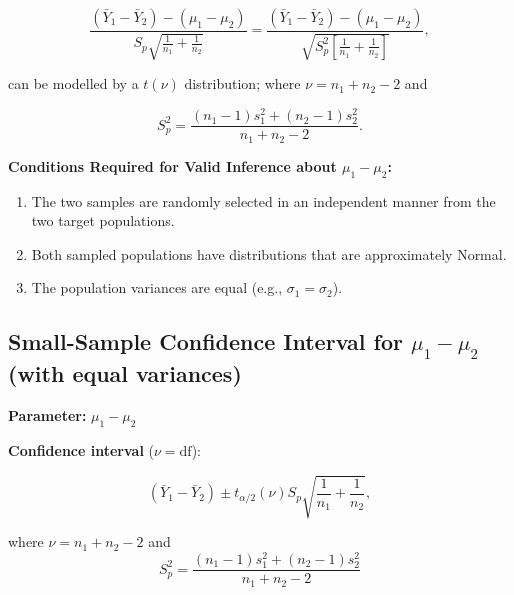 \[
\frac{(\bar{Y}_1 - \bar{Y}_2) - (\mu_1 - \mu_2)}{S_p \sqrt{\frac{1}{n_1} + \frac{1}{n_2}}}
= \frac{(\bar{Y}_1 - \bar{Y}_2) - (\mu_1 - \mu_2)}{\sqrt{S_p^2 \left[\frac{1}{n_1} + \frac{1}{n_2} \right] }},
\]

can be modelled by a $t(\nu)$ distribution; where $\nu = n_1 + n_2 - 2$ and

\[
S_p^2 = \frac{(n_1 - 1)s_1^2 + (n_2 - 1)s_2^2}{n_1 + n_2 - 2}.
\]
\begin{tcolorbox}[
  colback=yellow!5,
  colframe=yellow!50!black,
  title={Comparing Two Populations Means: Independent Sampling (Equal Variances Assumed) (cont.)},
  sharp corners,
  boxrule=0.4pt,
  width=\textwidth,
  breakable
]

\textbf{Conditions Required for Valid Inference about $\mu_1 - \mu_2$:}

\begin{enumerate}
  \item The two samples are randomly selected in an independent manner from the two target populations.
  \item Both sampled populations have distributions that are approximately Normal.
  \item The population variances are equal (e.g., $\sigma_1 = \sigma_2$).
\end{enumerate}
\end{tcolorbox}
\subsection*{Small-Sample Confidence Interval for $\mu_1 - \mu_2$ (with equal variances)}

\textbf{Parameter:} $\mu_1 - \mu_2$

\vspace{0.5em}

\textbf{Confidence interval} ($\nu = \text{df}$):

\[
(\bar{Y}_1 - \bar{Y}_2) \pm t_{\alpha/2}(\nu) S_p \sqrt{\frac{1}{n_1} + \frac{1}{n_2}},
\]

where $\nu = n_1 + n_2 - 2$ and
\[
S_p^2 = \frac{(n_1 - 1)s_1^2 + (n_2 - 1)s_2^2}{n_1 + n_2 - 2}
\]

